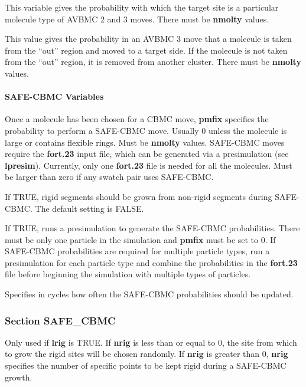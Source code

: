 \documentclass[12pt,letterpaper]{article}
\begin{document}
 This variable gives the probability
with which the target site is a particular molecule type of
AVBMC 2 and 3 moves. There must be {\bf nmolty} values.

 This value gives the probability in
an AVBMC 3 move that a molecule is taken from the ``out''
region and moved to a target side. If the molecule is not
taken from the ``out'' region, it is removed from another
cluster. There must be {\bf nmolty} values.

\paragraph{SAFE-CBMC Variables}

 Once a molecule has been chosen for a
CBMC move, {\bf pmfix} specifies the probability to perform
a SAFE-CBMC move. Usually 0 unless the molecule is large or
contains flexible rings. Must be {\bf nmolty} values.
SAFE-CBMC moves require the {\bf fort.23} input file, which
can be generated via a presimulation (see {\bf lpresim}). 
Currently, only one {\bf fort.23} file is needed for 
all the molecules.
Must be larger than zero if any swatch pair uses SAFE-CBMC.

 If TRUE, rigid segments should be grown
from non-rigid segments during SAFE-CBMC. The default
setting is FALSE.

 If TRUE, runs a presimulation to
generate the SAFE-CBMC probabilities. There must be only one
particle in the simulation and {\bf pmfix} must be set to 0.
If SAFE-CBMC probabilities are required for multiple
particle types, run a presimulation for each particle type
and combine the probabilities in the {\bf fort.23} file
before beginning the simulation with multiple types of
particles.

 Specifies in cycles how often the
SAFE-CBMC probabilities should be updated.

\subsubsection{Section \textbf{SAFE\_CBMC}}
 Only used if {\bf lrig} is TRUE. If
{\bf nrig} is less than or equal to 0, the site from which
to grow the rigid sites will be chosen randomly. If
{\bf nrig} is greater than 0, {\bf nrig} specifies the
number of specific points to be kept rigid during a
SAFE-CBMC growth.
\end{document}
